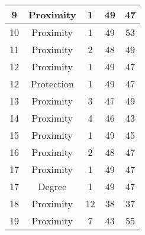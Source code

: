 \documentclass[results.tex]{subfiles}
\begin{document}
\begin{center}
\begin{tabular}{| c || c | c | c | c |}
            \hline
            9                       & Proximity                    & 1                      & 49                      & 47                   \\
            \hline
            10                      & Proximity                    & 1                      & 49                      & 53                   \\
            \hline
            11                      & Proximity                    & 2                      & 48                      & 49                   \\
            \hline
            12                      & Proximity                    & 1                      & 49                      & 47                   \\
            \hline
            12                      & Protection                   & 1                      & 49                      & 47                   \\
            \hline
            13                      & Proximity                    & 3                      & 47                      & 49                   \\
            \hline
            14                      & Proximity                    & 4                      & 46                      & 43                   \\
            \hline
            15                      & Proximity                    & 1                      & 49                      & 45                   \\
            \hline
            16                      & Proximity                    & 2                      & 48                      & 47                   \\
            \hline
            17                      & Proximity                    & 1                      & 49                      & 47                   \\
            \hline
            17                      & Degree                       & 1                      & 49                      & 47                   \\
            \hline
            18                      & Proximity                    & 12                     & 38                      & 37                   \\
            \hline
            19                      & Proximity                    & 7                      & 43                      & 55                   \\

\end{tabular}
\end{center}
\end{document}
